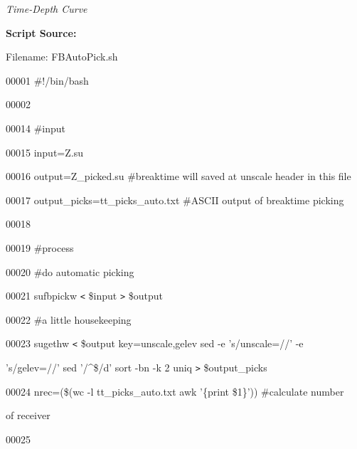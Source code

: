 \documentclass{article}
\begin{document}
\begin{center}
\vspace{16pt}
\textit{Time-Depth Curve\pagebreak{}}
\end{center}

\vspace{4pt}
\baselineskip=12pt
\leftskip=0pt
\textbf{Script Source:}

\vspace{4pt}
Filename: FBAutoPick.sh

\vspace{16pt}
00001 \#!/bin/bash

\vspace{4pt}
00002 \label{l00014}

\vspace{4pt}
00014 \#input

\vspace{4pt}
00015 input=Z.su

\vspace{4pt}
00016 output=Z\_picked.su \#breaktime will saved at unscale header in this file

\vspace{4pt}
00017 output\_picks=tt\_picks\_auto.txt \#ASCII output of breaktime picking 

\vspace{4pt}
00018 

\vspace{4pt}
00019 \#process

\vspace{4pt}
00020 \#do automatic picking

\vspace{4pt}
00021 sufbpickw \texttt{<} \$input \texttt{>} \$output

\vspace{4pt}
00022 \#a little housekeeping 

\vspace{4pt}
00023 sugethw \texttt{<} \$output key=unscale,gelev \textbar{} sed -e 's/unscale=//' 
-e 

\vspace{4pt}
's/gelev=//'\textbar{} sed '/\textasciicircum{}\$/d' \textbar{} sort -bn -k 2 \textbar{} 
uniq \texttt{>} \$output\_picks

\vspace{4pt}
00024 nrec=(\$(wc -l tt\_picks\_auto.txt \textbar{} awk '\{print \$1\}')) \#calculate 
number 

\vspace{4pt}
of receiver

\vspace{4pt}
00025 
\end{document}
